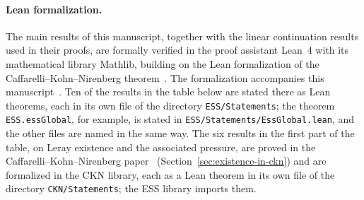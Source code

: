 \documentclass[11pt,letterpaper]{article}
\numberwithin{equation}{section}
\theoremstyle{plain}
\theoremstyle{definition}
\theoremstyle{remark}
\begin{document}
\paragraph{Lean formalization.}
The main results of this manuscript, together with the linear continuation results used in their proofs, are formally verified in the proof assistant Lean~4 with its mathematical library Mathlib, building on the Lean formalization of the Caffarelli--Kohn--Nirenberg theorem~\cite{CKNLean}. The formalization accompanies this manuscript~\cite{ESSLean}. Ten of the results in the table below are stated there as Lean theorems, each in its own file of the directory \texttt{ESS/Statements}; the theorem \texttt{ESS.essGlobal}, for example, is stated in \texttt{ESS/Statements/EssGlobal.lean}, and the other files are named in the same way. The six results in the first part of the table, on Leray existence and the associated pressure, are proved in the Caffarelli--Kohn--Nirenberg paper~\cite{CKNLean} (Section~\ref{sec:existence-in-ckn}) and are formalized in the CKN library, each as a Lean theorem in its own file of the directory \texttt{CKN/Statements}; the ESS library imports them.
\end{document}
